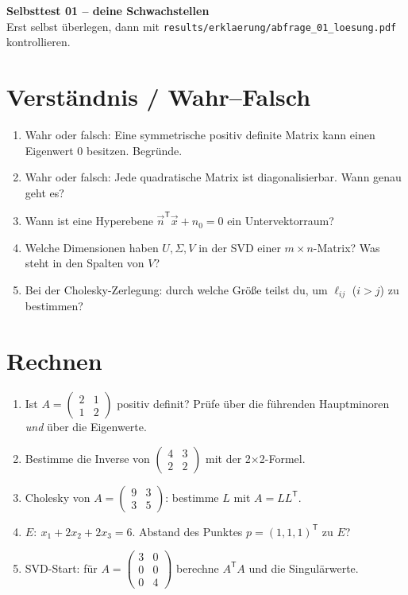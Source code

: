 \documentclass[a4paper,11pt]{article}
\newcommand{\transp}{^{\mathsf{T}}}
\newcommand{\antwort}[1]{\par\vspace{#1}}
\begin{document}
\color{fg}
\begin{center}
  {\color{accent}\LARGE\bfseries Selbsttest 01 -- deine Schwachstellen}\\[0.2em]
  {\small Erst selbst überlegen, dann mit \texttt{results/erklaerung/abfrage\_01\_loesung.pdf} kontrollieren.}
\end{center}
\vspace{0.4em}{\color{rulecol}\hrule}\vspace{0.6em}

\section*{Verständnis / Wahr--Falsch}
\begin{enumerate}[label=\arabic*.,leftmargin=*]
  \item Wahr oder falsch: Eine symmetrische positiv definite Matrix kann einen Eigenwert $0$ besitzen. Begründe.
  \item Wahr oder falsch: Jede quadratische Matrix ist diagonalisierbar. Wann genau geht es?
  \item Wann ist eine Hyperebene $\vec n\transp\vec x + n_0=0$ ein Untervektorraum?
  \item Welche Dimensionen haben $U,\Sigma,V$ in der SVD einer $m\times n$-Matrix?
        Was steht in den Spalten von $V$?
  \item Bei der Cholesky-Zerlegung: durch welche Größe teilst du, um $\ell_{ij}$ ($i>j$) zu bestimmen?
\end{enumerate}
\antwort{4.5cm}

\section*{Rechnen}
\begin{enumerate}[label=\arabic*.,leftmargin=*,resume]
  \item Ist $A=\begin{pmatrix}2&1\\1&2\end{pmatrix}$ positiv definit?
        Prüfe über die führenden Hauptminoren \emph{und} über die Eigenwerte.
  \item Bestimme die Inverse von $\begin{pmatrix}4&3\\2&2\end{pmatrix}$ mit der 2$\times$2-Formel.
  \item Cholesky von $A=\begin{pmatrix}9&3\\3&5\end{pmatrix}$: bestimme $L$ mit $A=LL\transp$.
  \item $E:\ x_1+2x_2+2x_3=6$. Abstand des Punktes $p=(1,1,1)\transp$ zu $E$?
  \item SVD-Start: für $A=\begin{pmatrix}3&0\\0&0\\0&4\end{pmatrix}$ berechne $A\transp A$ und die Singulärwerte.
\end{enumerate}
\antwort{6.5cm}
\end{document}
